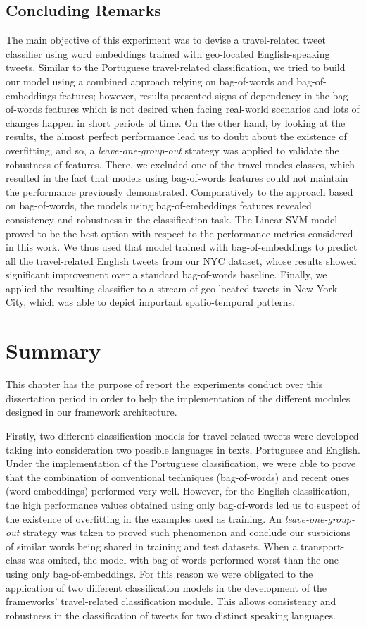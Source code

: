 \subsection{Concluding Remarks}
The main objective of this experiment was to devise a travel-related tweet classifier using word embeddings trained with geo-located English-speaking tweets. Similar to the Portuguese travel-related classification, we tried to build our model using a combined approach relying on bag-of-words and bag-of-embeddings features; however, results presented signs of dependency in the bag-of-words features which is not desired when facing real-world scenarios and lots of changes happen in short periods of time. On the other hand, by looking at the results, the almost perfect performance lead us to doubt about the existence of overfitting, and so, a \emph{leave-one-group-out} strategy was applied to validate the robustness of features. There, we excluded one of the travel-modes classes, which resulted in the fact that models using bag-of-words features could not maintain the performance previously demonstrated. Comparatively to the approach based on bag-of-words, the models using bag-of-embeddings features revealed consistency and robustness in the classification task. The Linear SVM model proved to be the best option with respect to the performance metrics considered in this work. We thus used that model trained with bag-of-embeddings to predict all the travel-related English tweets from our NYC dataset, whose results showed significant improvement over a standard bag-of-words baseline. Finally, we applied the resulting classifier to a stream of geo-located tweets in New York City, which was able to depict important spatio-temporal patterns.

\section{Summary}
This chapter has the purpose of report the experiments conduct over this dissertation period in order to help the implementation of the different modules designed in our framework architecture.

Firstly, two different classification models for travel-related tweets were developed taking into consideration two possible languages in texts, Portuguese and English. Under the implementation of the Portuguese classification, we were able to prove that the combination of conventional techniques (bag-of-words) and recent ones (word embeddings) performed very well. However, for the English classification, the high performance values obtained using only bag-of-words led us to suspect of the existence of overfitting in the examples used as training. An \textit{leave-one-group-out} strategy was taken to proved such phenomenon and conclude our suspicions of similar words being shared in training and test datasets. When a transport-class was omited, the model with bag-of-words performed worst than the one using only bag-of-embeddings. For this reason we were obligated to the application of two different classification models in the development of the frameworks' travel-related classification module. This allows consistency and robustness in the classification of tweets for two distinct speaking languages.

